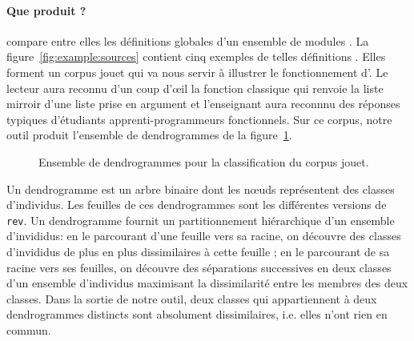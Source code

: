 \paragraph{Que produit {\Asak}?}
{\Asak} compare entre elles les définitions globales d'un ensemble de
modules {\OCaml}. La figure~\ref{fig:example:sources} contient cinq
exemples de telles définitions {\OCaml}. Elles forment un corpus jouet
qui va nous servir à illustrer le fonctionnement d'{\Asak}.  Le
lecteur aura reconnu d'un coup d'{\oe}il la fonction classique qui
renvoie la liste mirroir d'une liste prise en argument et l'enseignant
aura reconnnu des réponses typiques d'étudiants apprenti-programmeurs
fonctionnels. Sur ce corpus, notre outil produit l'ensemble de
dendrogrammes de la figure~\ref{fig:toy-classes}.

\begin{figure}
\begin{center}
\end{center}
\caption{Ensemble de dendrogrammes pour la classification du corpus jouet.}
\label{fig:toy-classes}
\end{figure}

Un dendrogramme est un arbre binaire dont les n{\oe}uds représentent
des classes d'individus. Les feuilles de ces dendrogrammes sont les
différentes versions de \texttt{rev}. Un dendrogramme fournit un
partitionnement hiérarchique d'un ensemble d'invididus: en le
parcourant d'une feuille vers sa racine, on découvre des classes
d'invididus de plus en plus dissimilaires à cette feuille ; en le
parcourant de sa racine vers ses feuilles, on découvre des séparations
successives en deux classes d'un ensemble d'individus maximisant la
dissimilarité entre les membres des deux classes. Dans la sortie
de notre outil, deux classes qui appartiennent à deux dendrogrammes
distincts sont absolument dissimilaires, i.e. elles n'ont rien en
commun.

